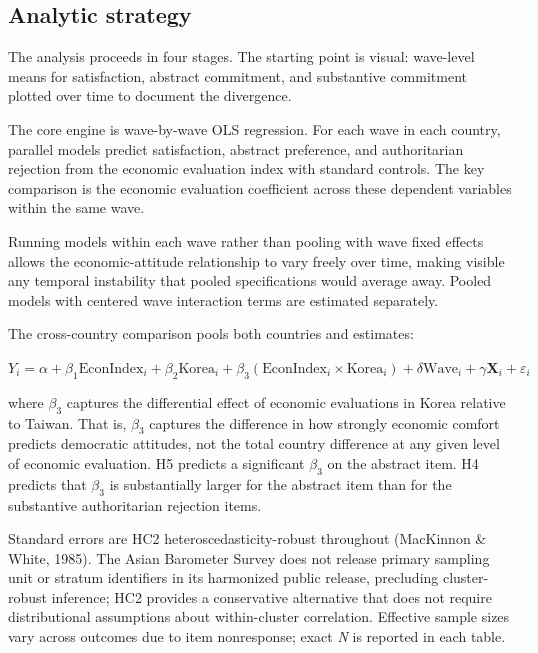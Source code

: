 \documentclass[
  12pt,
  12pt,
  letterpaper]{article}
\begin{document}
\subsection{Analytic strategy}\label{analytic-strategy}

The analysis proceeds in four stages. The starting point is visual:
wave-level means for satisfaction, abstract commitment, and substantive
commitment plotted over time to document the divergence.

The core engine is wave-by-wave OLS regression. For each wave in each
country, parallel models predict satisfaction, abstract preference, and
authoritarian rejection from the economic evaluation index with standard
controls. The key comparison is the economic evaluation coefficient
across these dependent variables within the same wave.

Running models within each wave rather than pooling with wave fixed
effects allows the economic-attitude relationship to vary freely over
time, making visible any temporal instability that pooled specifications
would average away. Pooled models with centered wave interaction terms
are estimated separately.

The cross-country comparison pools both countries and estimates:

\(Y_i = \alpha + \beta_1 \text{EconIndex}_i + \beta_2 \text{Korea}_i + \beta_3 (\text{EconIndex}_i \times \text{Korea}_i) + \delta \text{Wave}_i + \gamma \mathbf{X}_i + \varepsilon_i\)

where \(\beta_3\) captures the differential effect of economic
evaluations in Korea relative to Taiwan. That is, \(\beta_3\) captures
the difference in how strongly economic comfort predicts democratic
attitudes, not the total country difference at any given level of
economic evaluation. H5 predicts a significant \(\beta_3\) on the
abstract item. H4 predicts that \(\beta_3\) is substantially larger for
the abstract item than for the substantive authoritarian rejection
items.

Standard errors are HC2 heteroscedasticity-robust throughout (MacKinnon
\& White, 1985). The Asian Barometer Survey does not release primary
sampling unit or stratum identifiers in its harmonized public release,
precluding cluster-robust inference; HC2 provides a conservative
alternative that does not require distributional assumptions about
within-cluster correlation. Effective sample sizes vary across outcomes
due to item nonresponse; exact \emph{N} is reported in each table.
\end{document}

